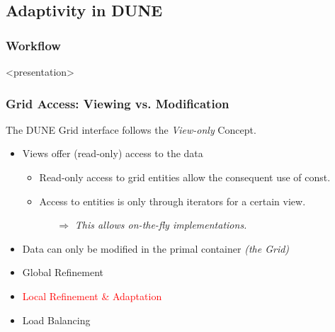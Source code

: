 \subsection{Adaptivity in DUNE}

\subsubsection*{Workflow}

\begin{frame}<presentation>
  \frametitle{Grid Access: Viewing vs. Modification}
  The DUNE Grid interface follows the \emph{View-only} Concept.
  \pause
  \begin{itemize}
    \item Views offer (read-only) access to the data
      \begin{itemize}
        \item Read-only access to grid entities allow the consequent use of const.
        \item Access to entities is only through iterators for a
          certain view. 
          \begin{itemize}
            \item[$\Rightarrow$] \emph{This allows on-the-fly implementations.}
          \end{itemize}
      \end{itemize}
    \item  Data can only be modified in the primal container \emph{(the Grid)}
  \end{itemize}
  \pause
  \begin{itemize}
    \item  Global Refinement

    \item  \textcolor{red}{Local Refinement \& Adaptation}

    \item  Load Balancing
  \end{itemize}
\end{frame}


